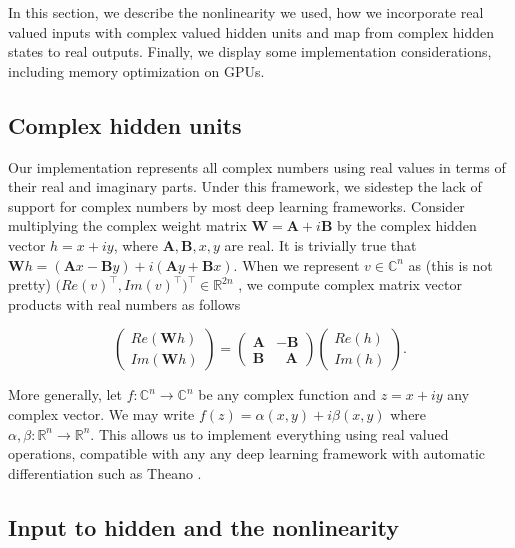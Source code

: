 \documentclass{article} %
\newcommand{\matr}[1]{\mathbf{#1}}
\newcommand\RR{\mathbb{R}}
\newcommand\CC{\mathbb{C}}
\begin{document}
In this section, we describe the nonlinearity we used, how we incorporate real valued inputs 
with complex valued hidden units and map from complex hidden states to real outputs. 
{\color{red}Finally, we display some implementation considerations, including memory optimization on GPUs}.

\subsection{Complex hidden units}

Our implementation represents all complex numbers using real values in terms of their
real and imaginary parts. Under this framework, we sidestep the lack of support for complex numbers 
by most deep learning frameworks. Consider multiplying the complex weight matrix 
$\matr{W} = \matr{A} + i \matr{B}$ by the complex hidden vector $h = x + i y$, where
$\matr{A}, \matr{B}, x, y$ are real.
It is trivially true that $\matr{W}h = (\matr{A}x - \matr{B}y) + i (\matr{A}y + \matr{B}x)$.
When we represent $v \in \CC^n$ as {\color{red} (this is not pretty)} $\big(Re(v)^\top, Im(v)^\top \big)^\top \in \RR^{2n}$ , we
compute complex matrix vector products with real numbers as follows

\begin{equation} \begin{pmatrix} Re(\matr{W}h) \\ Im(\matr{W}h) \end{pmatrix}  
= \begin{pmatrix} \matr{A} & -\matr{B} \\ \matr{B} & \ \ \ 
\matr{A} \end{pmatrix} \begin{pmatrix} Re(h) \\ Im(h) \end{pmatrix} .
\end{equation}

More generally, let $f: \CC^n \rightarrow \CC^n$ be any complex function and $z = x + i y$ 
any complex vector. We may write $ f(z) = \alpha(x, y) + i \beta(x, y) $ where 
$\alpha, \beta : \RR^n \rightarrow \RR^n$. 
This allows us to implement everything using real valued operations, compatible with any
any deep learning framework with automatic differentiation such as Theano \citep{Fred2010}.

\subsection{Input to hidden and the nonlinearity}
\end{document}
